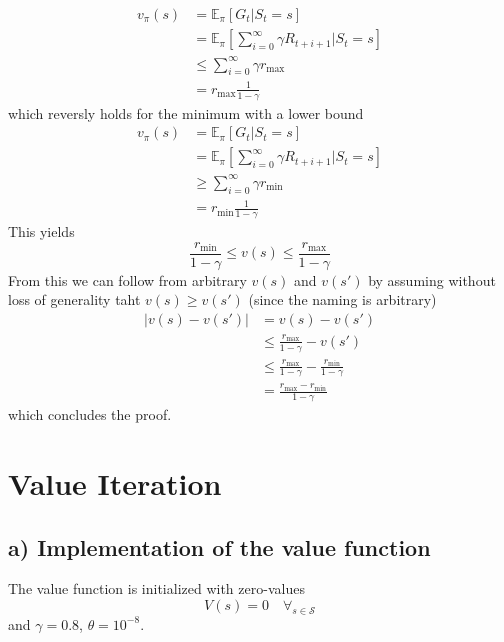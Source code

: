 \documentclass{article}
\begin{document}
\begin{align}
    v_\pi(s) &=  \mathbb{E}_\pi[G_t | S_t = s] \\
    &= \mathbb{E}_\pi [\sum_{i=0}^\infty \gamma R_{t+i+1}| S_t = s] \\
    &\leq \sum_{i=0}^\infty \gamma r_{\text{max}} \\
    &=r_{\text{max}} \frac{1}{1 - \gamma}
\end{align}
which reversly holds for the minimum with a lower bound
\begin{align}
    v_\pi(s) &=  \mathbb{E}_\pi[G_t | S_t = s] \\
    &= \mathbb{E}_\pi [\sum_{i=0}^\infty \gamma R_{t+i+1}| S_t = s] \\
    &\geq \sum_{i=0}^\infty \gamma r_{\text{min}} \\
    &=r_{\text{min}} \frac{1}{1 - \gamma}
\end{align}
 This yields
\begin{equation}
    \frac{r_{\text{min}}}{1- \gamma} \leq v(s) \leq \frac{r_{\text{max}}}{1 - \gamma}
\end{equation}
From this we can follow from arbitrary $v(s)$ and $v(s')$ by assuming without loss of generality taht $v(s) \geq v(s')$ (since the naming is arbitrary)
\begin{align}
    |v(s) - v(s')| &= v(s) - v(s') \\
    &\leq  \frac{r_{\text{max}}}{1 - \gamma} - v(s') \\ 
    &\leq  \frac{r_{\text{max}}}{1 - \gamma} -  \frac{r_{\text{min}}}{1- \gamma} \\ 
    &= \frac{r_{\text{max}}-r_{\text{min}}}{1- \gamma}
\end{align}
which concludes the proof.



\section*{Value Iteration}

\subsection*{a) Implementation of the value function}
The value function is initialized with zero-values 
\begin{equation}
    V(s) = 0 \quad \forall_{s \in \mathcal{S}}
\end{equation}
and $\gamma = 0.8$, $\theta=10^{-8}$. \\
\end{document}
